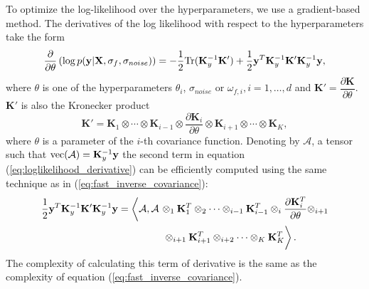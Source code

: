 To optimize the log-likelihood over the hyperparameters, we use a gradient-based method.
The derivatives of the log likelihood with respect to the hyperparameters take the form
\begin{equation}
\label{eq:loglikelihood_derivative}
    \frac{\partial}{\partial \theta} \left (\log \vphantom{p(\mathbf{y} | \mathbf{X}, \sigma_f, \sigma_{noise})}
    p(\mathbf{y} | \mathbf{X}, \sigma_f, \sigma_{noise}) \right ) =
    -\frac12 {\rm Tr}(\mathbf{K}_y^{-1} \mathbf{K}') + \frac12\mathbf{y}^T \mathbf{K}_y^{-1} \mathbf{K}' \mathbf{K}_y^{-1} \mathbf{y},
\end{equation}
where $\theta$ is one of the hyperparameters $\theta_i$, $\sigma_{noise}$ or $\omega_{f, i}, i = 1, \ldots, d$ and
$\mathbf{K}' = \dfrac{\partial \mathbf{K}}{\partial \theta}$.
$\mathbf{K}'$ is also the Kronecker product
\[
\mathbf{K}' = \mathbf{K}_1 \otimes \cdots \otimes \mathbf{K}_{i - 1} \otimes \frac{\partial \mathbf{K}_i}{\partial \theta}
\otimes \mathbf{K}_{i + 1} \otimes \cdots \otimes \mathbf{K}_K,
\]
where $\theta$ is a parameter of the $i$-th covariance function.
Denoting by $\mathcal{A}$, a tensor such that ${\rm vec}(\mathcal{A}) = \mathbf{K}_y^{-1}\mathbf{y}$
the second term in equation (\ref{eq:loglikelihood_derivative}) can be efficiently computed
using the same technique as in (\ref{eq:fast_inverse_covariance}):
\begin{align}
  \label{eq:fast_derivative_second_term}
    \frac12\mathbf{y}^T \mathbf{K}_y^{-1} \mathbf{K}'\mathbf{K}_y^{-1} \mathbf{y} =
    \left < \mathcal{A}, \mathcal{A}
    \vphantom{\frac{\partial \mathbf{K}_i^T}{\partial \theta}}
    \right .
    & \otimes_1 \mathbf{K}_1^T \otimes_2 \cdots \otimes_{i - 1}
    \mathbf{K}_{i - 1}^T \otimes_i
    \frac{\partial \mathbf{K}_i^T}{\partial \theta} \otimes_{i + 1} \nonumber \\
    &\left .
    \vphantom{\frac{\partial \mathbf{K}_i^T}{\partial \theta}}
    \otimes_{i + 1} \mathbf{K}_{i + 1}^T \otimes_{i + 2} \cdots \otimes_K \mathbf{K}_K^T \right >.
\end{align}
The complexity of calculating this term of derivative is the same as the complexity of
equation (\ref{eq:fast_inverse_covariance}).

